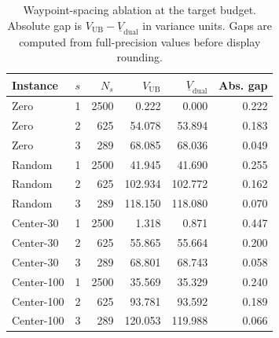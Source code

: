 \begin{table}[t]\centering\footnotesize\setlength{\tabcolsep}{4pt}
\caption{Waypoint-spacing ablation at the target budget. Absolute gap is
$V_{\mathrm{UB}}-\underline V_{\mathrm{dual}}$ in variance units. Gaps are computed
from full-precision values before display rounding.}
\label{tab:interval-ablation}
\begin{tabular}{llrrrr}
\toprule
Instance & $s$ & $N_s$ & $V_{\mathrm{UB}}$ & $\underline V_{\mathrm{dual}}$ & Abs. gap\\
\midrule
Zero       & 1 & 2500 &   0.222 &   0.000 & 0.222\\
Zero       & 2 &  625 &  54.078 &  53.894 & 0.183\\
Zero       & 3 &  289 &  68.085 &  68.036 & 0.049\\
Random     & 1 & 2500 &  41.945 &  41.690 & 0.255\\
Random     & 2 &  625 & 102.934 & 102.772 & 0.162\\
Random     & 3 &  289 & 118.150 & 118.080 & 0.070\\
Center-30  & 1 & 2500 &   1.318 &   0.871 & 0.447\\
Center-30  & 2 &  625 &  55.865 &  55.664 & 0.200\\
Center-30  & 3 &  289 &  68.801 &  68.743 & 0.058\\
Center-100 & 1 & 2500 &  35.569 &  35.329 & 0.240\\
Center-100 & 2 &  625 &  93.781 &  93.592 & 0.189\\
Center-100 & 3 &  289 & 120.053 & 119.988 & 0.066\\
\bottomrule
\end{tabular}
\end{table}

